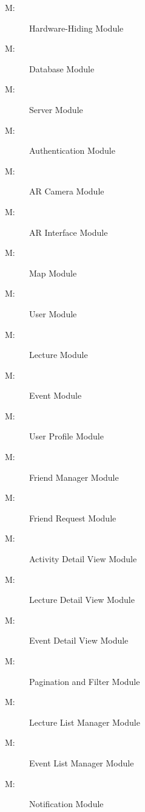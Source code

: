 \documentclass[12pt, titlepage]{article}
\newcounter{mnum}
\newcommand{\mthemnum}{M\themnum}
\begin{document}
\begin{description}
\item [ \mthemnum \label{mHH}:] Hardware-Hiding Module
\item [ \mthemnum \label{mDB}:] Database Module
\item [ \mthemnum \label{mServer}:] Server Module
\item [ \mthemnum \label{mAuth}:] Authentication Module
\item [ \mthemnum \label{mARCamera}:] AR Camera Module
\item [ \mthemnum \label{mARInterface}:] AR Interface Module
\item [ \mthemnum \label{mMap}:] Map Module
\item [ \mthemnum \label{mUser}:] User Module
\item [ \mthemnum \label{mLec}:] Lecture Module
\item [ \mthemnum \label{mEvent}:] Event Module
\item [ \mthemnum \label{mUP}:] User Profile Module
\item [ \mthemnum \label{mFM}:] Friend Manager Module
\item [ \mthemnum \label{mFR}:] Friend Request Module
\item [ \mthemnum \label{mADV}:] Activity Detail View Module
\item [ \mthemnum \label{mLDV}:] Lecture Detail View Module
\item [ \mthemnum \label{mEDV}:] Event Detail View Module
\item [ \mthemnum \label{mPF}:] Pagination and Filter Module
\item [ \mthemnum \label{mLL}:] Lecture List Manager Module
\item [ \mthemnum \label{mEL}:] Event List Manager Module
\item [ \mthemnum \label{mNotify}:] Notification Module
\end{description}
\end{document}
